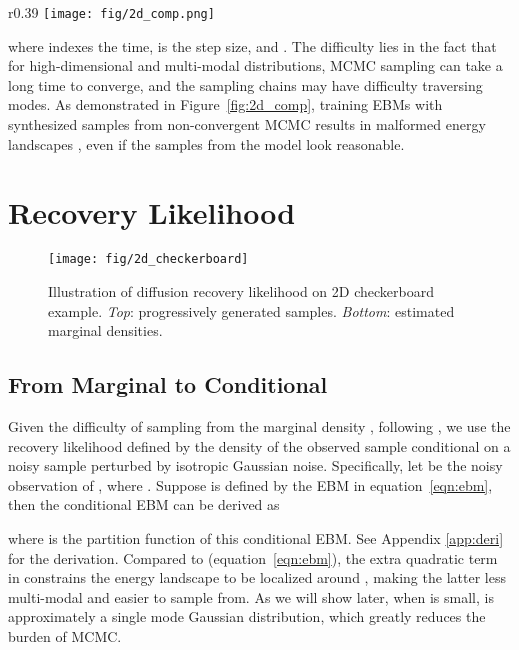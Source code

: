\documentclass{article} \usepackage{iclr2021_conference,times}
\def\Figref#1{Figure~\ref{#1}}
\def\eqref#1{equation~\ref{#1}}
\begin{document}
\begin{wrapfigure}{r}{0.39\linewidth}
\centering
\texttt{[image: fig/2d\_comp.png]}
\caption{Comparison of learning EBMs by diffusion recovery likelihood (Ours) versus marginal likelihood (Short-run).}
\vspace{-.7cm}
\label{fig:2d_comp}
\end{wrapfigure}
where  indexes the time,  is the step size, and . The difficulty lies in the fact that for high-dimensional and multi-modal distributions, MCMC sampling can take a long time to converge, and the sampling chains may have difficulty traversing modes. As demonstrated in \Figref{fig:2d_comp}, training EBMs with synthesized samples from non-convergent MCMC results in malformed energy landscapes \citep{nijkamp2019learning}, even if the samples from the model look reasonable.  
\section{Recovery Likelihood}
\begin{figure}[t]
\begin{center}
\texttt{[image: fig/2d\_checkerboard]}
\end{center}
\caption{Illustration of diffusion recovery likelihood on 2D checkerboard example. {\em Top}: progressively generated samples. {\em Bottom}: estimated marginal densities. }
\label{fig:2d}
\end{figure}
\subsection{From Marginal to Conditional}
Given the difficulty of sampling from the marginal density , following  \citet{bengio2013generalized}, we use the recovery likelihood defined by the density of the observed sample conditional on a noisy sample perturbed by isotropic Gaussian noise. Specifically, let  be the noisy observation of , where . Suppose  is defined by the EBM in  \eqref{eqn:ebm}, then the conditional EBM can be derived as 

where  is the partition function of this conditional EBM. See Appendix \ref{app:deri} for the derivation. 
Compared to  (\eqref{eqn:ebm}), the extra quadratic term  in  constrains the energy landscape to be localized around , making the latter less multi-modal and easier to sample from. As we will show later, when  is small,  is approximately a single mode Gaussian distribution, which greatly reduces the burden of MCMC. 
\end{document}
